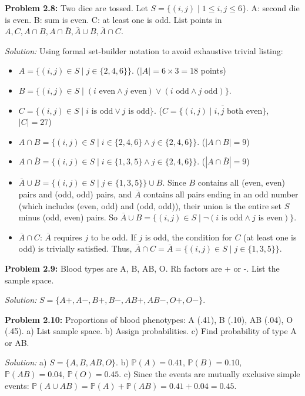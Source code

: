 \documentclass[11pt]{article}
\newcommand{\prob}[1]{\vspace{4mm}\noindent\textbf{Problem #1:}}
\newcommand{\sol}{\vspace{2mm}\noindent\textit{Solution: }}
\begin{document}
\prob{2.8}
Two dice are tossed. Let $S = \{(i, j) \mid 1 \le i,j \le 6\}$. 
A: second die is even. B: sum is even. C: at least one is odd. List points in $A, C, A \cap B, A \cap \overline{B}, \overline{A} \cup B, \overline{A} \cap C$.

\sol 
Using formal set-builder notation to avoid exhaustive trivial listing:
\begin{itemize}
    \item $A = \{(i, j) \in S \mid j \in \{2, 4, 6\}\}$. ($|A| = 6 \times 3 = 18$ points)
    \item $B = \{(i, j) \in S \mid (i \text{ even} \land j \text{ even}) \lor (i \text{ odd} \land j \text{ odd})\}$.
    \item $C = \{(i, j) \in S \mid i \text{ is odd} \lor j \text{ is odd}\}$. ($C = \overline{\{(i,j) \mid i,j \text{ both even}\}}$, $|C|=27$)
    \item $A \cap B = \{(i, j) \in S \mid i \in \{2, 4, 6\} \land j \in \{2, 4, 6\}\}$. ($|A \cap B| = 9$)
    \item $A \cap \overline{B} = \{(i, j) \in S \mid i \in \{1, 3, 5\} \land j \in \{2, 4, 6\}\}$. ($|A \cap \overline{B}| = 9$)
    \item $\overline{A} \cup B = \{(i, j) \in S \mid j \in \{1, 3, 5\}\} \cup B$. Since $B$ contains all (even, even) pairs and (odd, odd) pairs, and $\overline{A}$ contains all pairs ending in an odd number (which includes (even, odd) and (odd, odd)), their union is the entire set $S$ minus (odd, even) pairs. So $\overline{A} \cup B = \{(i, j) \in S \mid \neg(i \text{ is odd} \land j \text{ is even})\}$.
    \item $\overline{A} \cap C$: $\overline{A}$ requires $j$ to be odd. If $j$ is odd, the condition for $C$ (at least one is odd) is trivially satisfied. Thus, $\overline{A} \cap C = \overline{A} = \{(i, j) \in S \mid j \in \{1, 3, 5\}\}$.
\end{itemize}

\prob{2.9}
Blood types are A, B, AB, O. Rh factors are + or -. List the sample space.

\sol
$S = \{A+, A-, B+, B-, AB+, AB-, O+, O-\}$.

\prob{2.10}
Proportions of blood phenotypes: A (.41), B (.10), AB (.04), O (.45).
a) List sample space. b) Assign probabilities. c) Find probability of type A or AB.

\sol 
a) $S = \{A, B, AB, O\}$.
b) $\mathbb{P}(A)=0.41$, $\mathbb{P}(B)=0.10$, $\mathbb{P}(AB)=0.04$, $\mathbb{P}(O)=0.45$.
c) Since the events are mutually exclusive simple events: $\mathbb{P}(A \cup AB) = \mathbb{P}(A) + \mathbb{P}(AB) = 0.41 + 0.04 = 0.45$.
\end{document}
